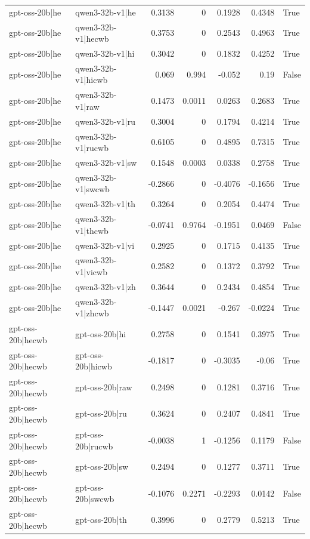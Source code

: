 \begin{table}
\begin{tabular}{l l r r r r l}
gpt-oss-20b|he & qwen3-32b-v1|he & 0.3138 & 0 & 0.1928 & 0.4348 & True \\
gpt-oss-20b|he & qwen3-32b-v1|hecwb & 0.3753 & 0 & 0.2543 & 0.4963 & True \\
gpt-oss-20b|he & qwen3-32b-v1|hi & 0.3042 & 0 & 0.1832 & 0.4252 & True \\
gpt-oss-20b|he & qwen3-32b-v1|hicwb & 0.069 & 0.994 & -0.052 & 0.19 & False \\
gpt-oss-20b|he & qwen3-32b-v1|raw & 0.1473 & 0.0011 & 0.0263 & 0.2683 & True \\
gpt-oss-20b|he & qwen3-32b-v1|ru & 0.3004 & 0 & 0.1794 & 0.4214 & True \\
gpt-oss-20b|he & qwen3-32b-v1|rucwb & 0.6105 & 0 & 0.4895 & 0.7315 & True \\
gpt-oss-20b|he & qwen3-32b-v1|sw & 0.1548 & 0.0003 & 0.0338 & 0.2758 & True \\
gpt-oss-20b|he & qwen3-32b-v1|swcwb & -0.2866 & 0 & -0.4076 & -0.1656 & True \\
gpt-oss-20b|he & qwen3-32b-v1|th & 0.3264 & 0 & 0.2054 & 0.4474 & True \\
gpt-oss-20b|he & qwen3-32b-v1|thcwb & -0.0741 & 0.9764 & -0.1951 & 0.0469 & False \\
gpt-oss-20b|he & qwen3-32b-v1|vi & 0.2925 & 0 & 0.1715 & 0.4135 & True \\
gpt-oss-20b|he & qwen3-32b-v1|vicwb & 0.2582 & 0 & 0.1372 & 0.3792 & True \\
gpt-oss-20b|he & qwen3-32b-v1|zh & 0.3644 & 0 & 0.2434 & 0.4854 & True \\
gpt-oss-20b|he & qwen3-32b-v1|zhcwb & -0.1447 & 0.0021 & -0.267 & -0.0224 & True \\
gpt-oss-20b|hecwb & gpt-oss-20b|hi & 0.2758 & 0 & 0.1541 & 0.3975 & True \\
gpt-oss-20b|hecwb & gpt-oss-20b|hicwb & -0.1817 & 0 & -0.3035 & -0.06 & True \\
gpt-oss-20b|hecwb & gpt-oss-20b|raw & 0.2498 & 0 & 0.1281 & 0.3716 & True \\
gpt-oss-20b|hecwb & gpt-oss-20b|ru & 0.3624 & 0 & 0.2407 & 0.4841 & True \\
gpt-oss-20b|hecwb & gpt-oss-20b|rucwb & -0.0038 & 1 & -0.1256 & 0.1179 & False \\
gpt-oss-20b|hecwb & gpt-oss-20b|sw & 0.2494 & 0 & 0.1277 & 0.3711 & True \\
gpt-oss-20b|hecwb & gpt-oss-20b|swcwb & -0.1076 & 0.2271 & -0.2293 & 0.0142 & False \\
gpt-oss-20b|hecwb & gpt-oss-20b|th & 0.3996 & 0 & 0.2779 & 0.5213 & True \\

\end{tabular}
\end{table}
